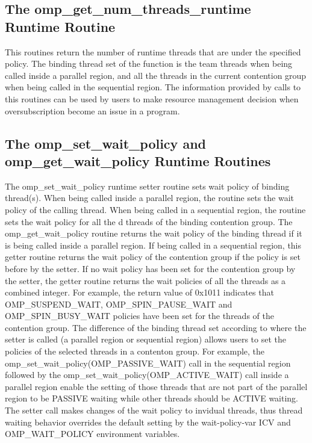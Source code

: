 \subsection{The {\sf omp\_get\_num\_threads\_runtime} Runtime Routine}
This routines return the number of runtime threads that are under the specified policy. The binding thread set 
of the function is the team threads when being called inside a parallel region, and all the threads in the current 
contention group when being called in the sequential region. The information provided by calls to this routines can be used 
by users to make resource management decision when oversubscription become an issue in a program. 

\subsection{The {\sf omp\_set\_wait\_policy} and {\sf omp\_get\_wait\_policy} Runtime Routines}
The {\sf omp\_set\_wait\_policy} runtime setter routine sets wait policy of binding thread(s). 
When being called inside a {\sf parallel} region, the routine sets the wait policy of the calling thread. 
When being called in a sequential region, the routine sets the wait policy for all the 
d threads of the binding contention group. The {\sf omp\_get\_wait\_policy} routine returns the wait policy 
of the binding thread if it is being called inside a {\sf parallel} region. If being called in a sequential region, 
this getter routine returns the wait policy of the contention group if the policy is set before by the setter. 
If no wait policy has been set for the contention group by the setter, the getter routine returns the wait policies 
of all the threads as a combined integer. For example, the return value of 0x1011 indicates that OMP\_SUSPEND\_WAIT, 
OMP\_SPIN\_PAUSE\_WAIT and OMP\_SPIN\_BUSY\_WAIT policies have been set for the threads of the contention group. The
difference of the binding thread set according to where the setter is called (a {\sf parallel} region or sequential region) 
allows users to set the policies of the selected threads in a contenton group. For example, the {\sf omp\_set\_wait\_policy(OMP\_PASSIVE\_WAIT)} 
call in the sequential region followed by the {\sf omp\_set\_wait\_policy(OMP\_ACTIVE\_WAIT)}  
call inside a {\sf parallel} region enable the setting of those threads that are not part of the {\sf parallel} region to be PASSIVE waiting while
other threads should be ACTIVE waiting. 
The setter call makes changes of the wait policy to invidual threads, thus thread waiting behavior overrides the default 
setting by the wait-policy-var ICV and OMP\_WAIT\_POLICY environment variables. 

